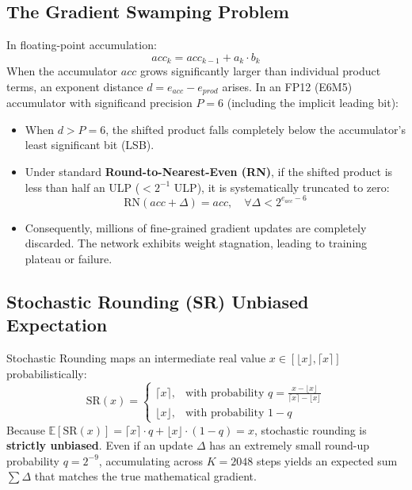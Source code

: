 \documentclass[11pt,a4paper]{article}
\begin{document}
\subsection{The Gradient Swamping Problem}
In floating-point accumulation:
\begin{equation}
acc_{k} = acc_{k-1} + a_k \cdot b_k
\end{equation}
When the accumulator $acc$ grows significantly larger than individual product terms, an exponent distance $d = e_{acc} - e_{prod}$ arises. In an FP12 (E6M5) accumulator with significand precision $P = 6$ (including the implicit leading bit):
\begin{itemize}
    \item When $d > P = 6$, the shifted product falls completely below the accumulator's least significant bit (LSB).
    \item Under standard \textbf{Round-to-Nearest-Even (RN)}, if the shifted product is less than half an ULP ($< 2^{-1}$ ULP), it is systematically truncated to zero:
    \begin{equation}
    \text{RN}(acc + \Delta) = acc, \quad \forall \Delta < 2^{e_{acc} - 6}
    \end{equation}
    \item Consequently, millions of fine-grained gradient updates are completely discarded. The network exhibits weight stagnation, leading to training plateau or failure.
\end{itemize}

\subsection{Stochastic Rounding (SR) Unbiased Expectation}
Stochastic Rounding maps an intermediate real value $x \in [\lfloor x \rfloor, \lceil x \rceil]$ probabilistically:
\begin{equation}
\text{SR}(x) = 
\begin{cases} 
\lceil x \rceil, & \text{with probability } q = \frac{x - \lfloor x \rfloor}{\lceil x \rceil - \lfloor x \rfloor} \\
\lfloor x \rfloor, & \text{with probability } 1 - q 
\end{cases}
\end{equation}
Because $\mathbb{E}[\text{SR}(x)] = \lceil x \rceil \cdot q + \lfloor x \rfloor \cdot (1 - q) = x$, stochastic rounding is \textbf{strictly unbiased}. Even if an update $\Delta$ has an extremely small round-up probability $q = 2^{-9}$, accumulating across $K = 2048$ steps yields an expected sum $\sum \Delta$ that matches the true mathematical gradient.
\end{document}
